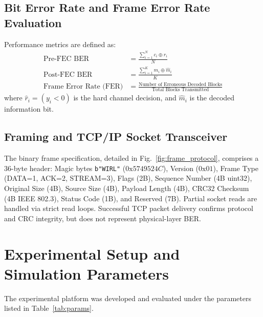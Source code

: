 \documentclass[conference]{IEEEtran}
\begin{document}
\subsection{Bit Error Rate and Frame Error Rate Evaluation}
Performance metrics are defined as:
\begin{align}
\text{Pre-FEC BER} &= \frac{\sum_{i=1}^N c_i \oplus \hat{r}_i}{N} \\
\text{Post-FEC BER} &= \frac{\sum_{i=1}^K m_i \oplus \hat{m}_i}{K} \\
\text{Frame Error Rate (FER)} &= \frac{\text{Number of Erroneous Decoded Blocks}}{\text{Total Blocks Transmitted}}
\end{align}
where $\hat{r}_i = (y_i < 0)$ is the hard channel decision, and $\hat{m}_i$ is the decoded information bit.

\subsection{Framing and TCP/IP Socket Transceiver}
The binary frame specification, detailed in Fig.~\ref{fig:frame_protocol}, comprises a 36-byte header:
Magic bytes \texttt{b"WIRL"} ($0\text{x}5749524C$), Version ($0\text{x}01$), Frame Type (DATA=1, ACK=2, STREAM=3), Flags (2B), Sequence Number (4B uint32), Original Size (4B), Source Size (4B), Payload Length (4B), CRC32 Checksum (4B IEEE 802.3), Status Code (1B), and Reserved (7B). Partial socket reads are handled via strict read loops. Successful TCP packet delivery confirms protocol and CRC integrity, but does not represent physical-layer BER.

\section{Experimental Setup and Simulation Parameters}
The experimental platform was developed and evaluated under the parameters listed in Table~\ref{tab:params}.
\end{document}
